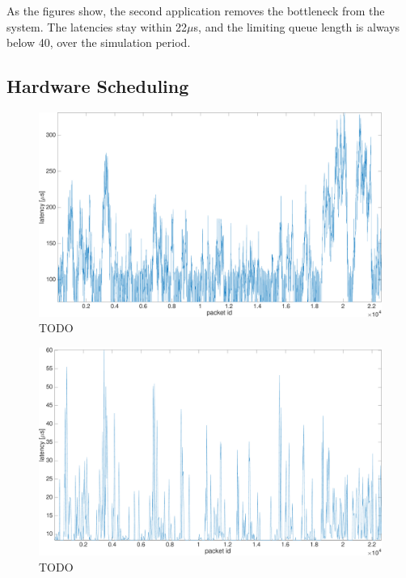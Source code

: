 As the figures show, the second application removes the bottleneck from the system. The latencies stay within 22$\mu$s, and the limiting queue length is always below 40, over the simulation period.

\subsection{Hardware Scheduling}
\begin{figure}[]
  \begin{center}
    \includegraphics[width=\textwidth]{images/experiment/exp2-app1-no-coremask-latency.pdf}
    \caption{TODO}
    \label{fig:exp2-app1-no-coremask-latency}
  \end{center}
\end{figure}

\begin{figure}[]
  \begin{center}
    \includegraphics[width=\textwidth]{images/experiment/exp2-app2-no-coremask-latency.pdf}
    \caption{TODO}
    \label{fig:exp2-app2-no-coremask-latency}
  \end{center}
\end{figure}

